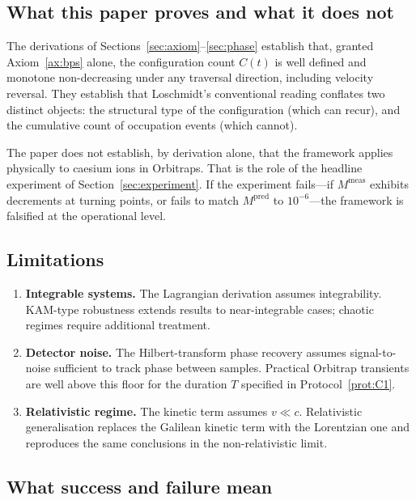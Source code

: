 \documentclass[twocolumn,10pt,a4paper]{article}
\theoremstyle{thmstyle}
\theoremstyle{definition}
\theoremstyle{remark}
\begin{document}
\subsection{What this paper proves and what it does not}

The derivations of Sections~\ref{sec:axiom}--\ref{sec:phase} establish
that, granted Axiom~\ref{ax:bps} alone, the configuration count
$C(t)$ is well defined and monotone non-decreasing under any
traversal direction, including velocity reversal. They establish that
Loschmidt's conventional reading conflates two distinct objects:
the structural type of the configuration (which can recur), and the
cumulative count of occupation events (which cannot).

The paper does not establish, by derivation alone, that the framework
applies physically to caesium ions in Orbitraps. That is the role of
the headline experiment of Section~\ref{sec:experiment}. If the
experiment fails---if $M^{\mathrm{meas}}$ exhibits decrements at
turning points, or fails to match $M^{\mathrm{pred}}$ to $10^{-6}$---the
framework is falsified at the operational level.

\subsection{Limitations}

\begin{enumerate}[nosep,leftmargin=*]
\item \textbf{Integrable systems.} The Lagrangian derivation assumes
integrability. KAM-type robustness \citep{kolmogorov1954,arnold1963,moser1962}
extends results to near-integrable cases; chaotic regimes require
additional treatment.
\item \textbf{Detector noise.} The Hilbert-transform phase recovery
assumes signal-to-noise sufficient to track phase between samples.
Practical Orbitrap transients are well above this floor for the
duration $T$ specified in Protocol~\ref{prot:C1}.
\item \textbf{Relativistic regime.} The kinetic term assumes
$v\ll c$. Relativistic generalisation replaces the Galilean kinetic
term with the Lorentzian one and reproduces the same conclusions in
the non-relativistic limit.
\end{enumerate}

\subsection{What success and failure mean}
\end{document}
